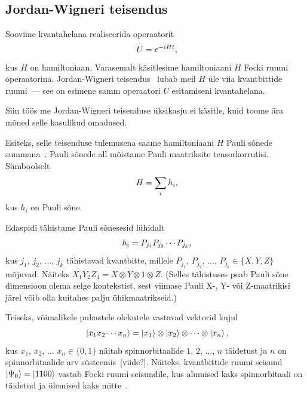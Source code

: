 \documentclass[12pt]{article}
\newcommand{\TODO}{\todo[inline]}
\def\ket#1{\mathinner{|#1\rangle}}
\begin{document}
\subsection{Jordan-Wigneri teisendus}

\TODO{Neutraalsem sõnastus!}

Soovime kvantahelana realiseerida operaatorit
\begin{equation}\label{eq:hamtime}
  U = e^{-iHt}\rlap{,}
\end{equation}
kus \(H\) on hamiltoniaan.
Varasemalt käsitlesime hamiltoniaani \(H\) Focki ruumi operaatorina.
Jordan-Wigneri teisendus~\cite{jordan+wigner} lubab meil \(H\) üle viia kvantbittide ruumi~--- see on esimene samm operaatori \(U\) esitamiseni kvantahelana.

Siin töös me Jordan-Wigneri teisenduse üksikasju ei käsitle, kuid toome ära mõned selle kasulikud omadused.

Esiteks, selle teisenduse tulemusena saame hamiltoniaani \(H\) Pauli sõnede summana~\cite{whitfield+etal}.
Pauli sõnede all mõistame Pauli maatriksite tensorkorrutisi.
Sümboolselt
\begin{equation}\label{eq:paulisum} H = \sum_i h_i\rlap{,} \end{equation}
kus $h_i$ on Pauli sõne.

Edaspidi tähistame Pauli sõnesesid lühidalt
\begin{equation} h_i=P_{j_1}P_{j_2}\cdots P_{j_k} \rlap{,}\end{equation}
kus \(j_1\), \(j_2\), $\ldots$, \(j_k\) tähistavad kvantbitte, millele \(P_{j_1}\), \(P_{j_2}\), \(\ldots\), \(P_{j_k}\in\{X,Y,Z\}\) mõjuvad.
Näiteks \(X_1Y_2Z_4=X\otimes Y\otimes 1\otimes Z.\)
(Selles tähistuses peab Pauli sõne dimensioon olema selge kontekstist, sest viimase Pauli X-, Y- või Z-maatrikisi järel võib olla kuitahes palju ühikmaatrikseid.)

Teiseks, võimalikele puhastele olekutele vastavad vektorid kujul
\begin{equation}
  \ket{x_1x_2\cdots x_n}
     = \ket{x_1}\otimes\ket{x_2}\otimes\cdots\otimes\ket{x_n}\rlap{,}
\end{equation}
kus $x_1$, $x_2$, $\ldots$ $x_n\in\{0,1\}$ näitab spinnorbitaalide $1$, $2$, $\ldots$, $n$ täidetust ja $n$ on spinnorbitaalide arv süsteemis~[viide?].
Näiteks, kvantbittide ruumi seisund \(\ket{\Psi_0}=\ket{1100}\) vastab Focki ruumi seisundile, kus alumised kaks spinnorbitaali on täidetud ja ülemised kaks mitte~\cite{szabo+ostlund, mcardle+etal}.
\end{document}
